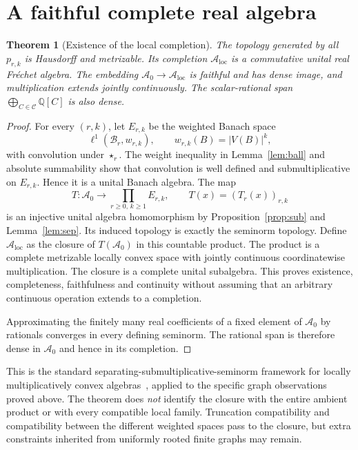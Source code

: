 \documentclass[11pt]{article}
\newtheorem{theorem}{Theorem}
\theoremstyle{definition}\newtheorem{definition}[theorem]{Definition}
\newcommand{\Q}{\mathbb Q}
\newcommand{\A}{\mathcal A}
\newcommand{\B}{\mathcal B}
\newcommand{\abs}[1]{\left|#1\right|}
\begin{document}
\section{A faithful complete real algebra}

\begin{theorem}[Existence of the local completion]\label{thm:completion}
The topology generated by all $p_{r,k}$ is Hausdorff and metrizable. Its completion $\A_{\mathrm{loc}}$ is a commutative unital real Fr\'echet algebra. The embedding $\A_0\to\A_{\mathrm{loc}}$ is faithful and has dense image, and multiplication extends jointly continuously. The scalar-rational span $\bigoplus_{C\in\mathcal C}\Q[C]$ is also dense.
\end{theorem}
\begin{proof}
For every $(r,k)$, let $E_{r,k}$ be the weighted Banach space
\[
 \ell^1(\B_r,w_{r,k}),\qquad w_{r,k}(B)=\abs{V(B)}^k,
\]
with convolution under $\star_r$. The weight inequality in Lemma~\ref{lem:ball} and absolute summability show that convolution is well defined and submultiplicative on $E_{r,k}$. Hence it is a unital Banach algebra. The map
\[
 T:\A_0\longrightarrow\prod_{r\ge0,\,k\ge1}E_{r,k},
 \qquad T(x)=(T_r(x))_{r,k}
\]
is an injective unital algebra homomorphism by Proposition~\ref{prop:sub} and Lemma~\ref{lem:sep}. Its induced topology is exactly the seminorm topology. Define $\A_{\mathrm{loc}}$ as the closure of $T(\A_0)$ in this countable product. The product is a complete metrizable locally convex space with jointly continuous coordinatewise multiplication. The closure is a complete unital subalgebra. This proves existence, completeness, faithfulness and continuity without assuming that an arbitrary continuous operation extends to a completion.

Approximating the finitely many real coefficients of a fixed element of $\A_0$ by rationals converges in every defining seminorm. The rational span is therefore dense in $\A_0$ and hence in its completion.
\end{proof}

This is the standard separating-submultiplicative-seminorm framework for locally multiplicatively convex algebras~\cite{Infusino}, applied to the specific graph observations proved above. The theorem does \emph{not} identify the closure with the entire ambient product or with every compatible local family. Truncation compatibility and compatibility between the different weighted spaces pass to the closure, but extra constraints inherited from uniformly rooted finite graphs may remain.
\end{document}
